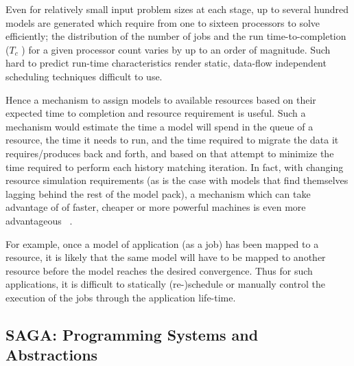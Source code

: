 \documentclass[conference,final]{IEEEtran}
\newcommand{\tc}{$T_c$ }
\begin{document}
Even for relatively small input problem sizes at each stage, up to
several hundred models are generated which require from one to sixteen
processors to solve efficiently; the distribution of the number of
jobs and the run time-to-completion (\tc) for a given processor count
varies by up to an order of magnitude.  Such hard to predict run-time
characteristics render static, data-flow independent scheduling
techniques difficult to use.  %

Hence a mechanism to assign models to available resources based on
their expected time to completion and resource requirement is useful.
Such a mechanism would estimate the time a model will spend in the
queue of a resource, the time it needs to run, and the time required
to migrate the data it requires/produces back and forth, and based on
that attempt to minimize the time required to perform each history
matching iteration.  In fact, with changing resource simulation
requirements (as is the case with models that find themselves lagging
behind the rest of the model pack), a mechanism which can take
advantage of of faster, cheaper or more powerful machines is even more
advantageous ~\cite{escience07}.

For example, once a model of application (as a job) has been mapped to
a resource, it is likely that the same model will have to be mapped to
another resource before the model reaches the desired convergence.
Thus for such applications, it is difficult to statically
(re-)schedule or manually control the execution of the jobs through
the application life-time.


\subsection{SAGA: Programming Systems and Abstractions}

\end{document}
